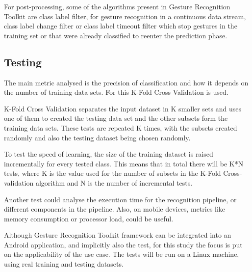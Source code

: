 For post-processing, some of the algorithms present in Gesture Recognition Toolkit are class label filter, for gesture recognition in a continuous data stream, class label change filter or class label timeout filter which stop gestures in the training set or that were already classified to reenter the prediction phase.

\subsection{Testing}

The main metric analysed is the precision of classification and how it depends on the number of training data sets. For this K-Fold Cross Validation is used.

K-Fold Cross Validation separates the input dataset in K smaller sets and uses one of them to created the testing data set and the other subsets form the training data sets. These tests are repeated K times, with the subsets created randomly and also the testing dataset being chosen randomly.

To test the speed of learning, the size of the training dataset is raised incrementally for every tested class. This means that in total there will be K*N tests, where K is the value used for the number of subsets in the K-Fold Cross-validation algorithm and N is the number of incremental tests.

Another test could analyse the execution time for the recognition pipeline, or different components in the pipeline. Also, on mobile devices, metrics like memory consumption or processor load, could be useful.

Although Gesture Recognition Toolkit framework can be integrated into an Android application, and implicitly also the test, for this study the focus is put on the applicability of the use case. The tests will be run on a Linux machine, using real training and testing datasets.
